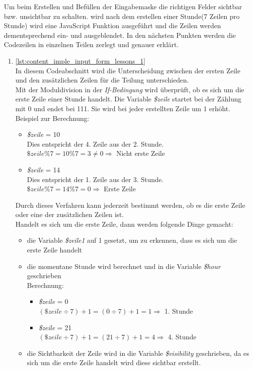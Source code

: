 Um beim Erstellen und Befüllen der Eingabemaske die richtigen Felder sichtbar bzw. unsichtbar zu schalten. wird nach dem erstellen einer Stunde(7 Zeilen pro Stunde) wird eine JavaScript Funktion ausgeführt und die Zeilen werden dementsprechend ein- und ausgeblendet.
In den nächsten Punkten werden die Codezeilen in einzelnen Teilen zerlegt und genauer erklärt.
\begin{enumerate}

	\item \autoref{lst:content_imple_input_form_lessons_1}\\
	In diesem Codeabschnitt wird die Unterscheidung zwischen der ersten Zeile und den zusätzlichen Zeilen für die Teilung unterschieden.\\
	Mit der Moduldivision in der \textit{If-Bedingung} wird überprüft, ob es sich um die erste Zeile einer Stunde handelt. Die Variable \textit{\$zeile} startet bei der Zählung mit 0 und endet bei 111. Sie wird bei jeder erstellten Zeile um 1 erhöht.\\
	Beispiel zur Berechnung:
	
	\begin{itemize}
		\item \textit{\$zeile} = 10\\
		Dies entspricht der 4. Zeile aus der 2. Stunde.\\
		$ \$zeile \% 7 = 10 \% 7 = 3 \ne 0 \Rightarrow $ Nicht erste Zeile
		\item \textit{\$zeile} = 14\\
		Dies entspricht der 1. Zeile aus der 3. Stunde.\\
		$ \$zeile \% 7 = 14 \% 7 = 0 \Rightarrow $ Erste Zeile
	\end{itemize}
	
	Durch dieses Verfahren kann jederzeit bestimmt werden, ob es die erste Zeile oder eine der zusätzlichen Zeilen ist.\\
	Handelt es sich um die erste Zeile, dann werden folgende Dinge gemacht:
	
	\begin{itemize}
		\item die Variable \textit{\$zeile1} auf 1 gesetzt, um zu erkennen, dass es sich um die erste Zeile handelt
		\item die momentane Stunde wird berechnet und in die Variable \textit{\$hour} geschrieben\\
		Berechnung:
		\begin{itemize}
			\item \textit{\$zeile} = 0\\
			$ (\$zeile \div 7) + 1 = ( 0 \div 7 ) + 1 = 1 \Rightarrow $ 1. Stunde
			\item \textit{\$zeile} = 21\\
			$ (\$zeile \div 7) + 1 = ( 21 \div 7 ) + 1 = 4 \Rightarrow $ 4. Stunde\\
		\end{itemize}
		\item die Sichtbarkeit der Zeile wird in die Variable \textit{\$visibility} geschrieben, da es sich um die erste Zeile handelt wird diese sichtbar erstellt.
	\end{itemize}
	

\end{enumerate}
